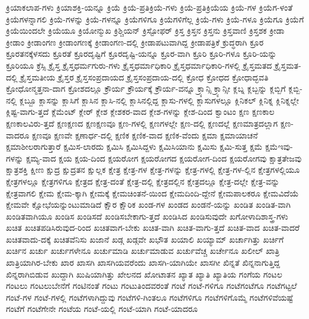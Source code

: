 {ಕ್ರಿಯಾಕಲಾಪ-ಗಳು
ಕ್ರಿಯಾಶಕ್ತಿ-ಯನ್ನೂ
ಕ್ರಿಯೆ
ಕ್ರಿಯೆ-ಪ್ರತಿಕ್ರಿಯೆ-ಗಳು
ಕ್ರಿಯೆ-ಪ್ರತಿಕ್ರಿಯೆಯ
ಕ್ರಿಯೆ-ಗಳ
ಕ್ರಿಯೆಗ-ಳಂತೆ
ಕ್ರಿಯೆಗಳನ್ನಾಗಲಿ
ಕ್ರಿಯೆ-ಗಳನ್ನು
ಕ್ರಿಯೆ-ಗಳನ್ನೂ
ಕ್ರಿಯೆಗಳಿಗೂ
ಕ್ರಿಯೆಗಳಿಗೆಲ್ಲ
ಕ್ರಿಯೆ-ಗಳು
ಕ್ರಿಯೆ-ಗಳೂ
ಕ್ರಿಯೆಗೂ
ಕ್ರಿಯೆಗೆ
ಕ್ರಿಯೆಯಿಂದಲೇ
ಕ್ರಿಯೆಯೂ
ಕ್ರಿಯೋನ್ಮುಖ
ಕ್ರಿಶ್ಚಿಯನ್
ಕ್ರಿಸ್ಟೋಫರ್
ಕ್ರಿಸ್ತ
ಕ್ರಿಸ್ತನ
ಕ್ರಿಸ್ತನು
ಕ್ರಿಸ್ತವಾಣಿ
ಕ್ರಿಸ್ತಶಕ
ಕ್ರೀಡಾ
ಕ್ರೀಡಾಂ
ಕ್ರೀಡಾಂಗಣ
ಕ್ರೀಡಾಂಗಣಕ್ಕೆ
ಕ್ರೀಡಾಂಗಣ-ದಲ್ಲಿ
ಕ್ರೀಡಾಪಟುವಾಗಿದ್ದ
ಕ್ರೀಡಾಪತ್ರಿಕೆ
ಕ್ರುದ್ಧರಾಗಿ
ಕ್ರೂರ
ಕ್ರೂರತನಕ್ಕೆಳಸದು
ಕ್ರೂರತೆ
ಕ್ರೂರದೃಷ್ಟಿಗೆ
ಕ್ರೂರದೃಷ್ಟಿ-ಯನ್ನೂ
ಕ್ರೂರ-ವಾಗಿ
ಕ್ರೂರಿ
ಕ್ರೂರಿ-ಗಳೂ
ಕ್ರೂರಿ-ಯನ್ನು
ಕ್ರೂರಿಯೂ
ಕ್ರೆಸ್ಸಿ
ಕ್ರೈಸ್ತ
ಕ್ರೈಸ್ತಧರ್ಮಗುರು-ಗಳು
ಕ್ರೈಸ್ತಧರ್ಮಾಧಿಕಾರಿ
ಕ್ರೈಸ್ತಧರ್ಮಾಧಿಕಾರಿ-ಗಳಲ್ಲಿ
ಕ್ರೈಸ್ತಮತದ
ಕ್ರೈಸ್ತಮತ-ದಲ್ಲಿ
ಕ್ರೈಸ್ತಮತೀಯ
ಕ್ರೈಸ್ತರ
ಕ್ರೈಸ್ತಸಂಪ್ರದಾಯದ
ಕ್ರೈಸ್ತಸಂಪ್ರದಾಯ-ದಲ್ಲಿ
ಕ್ರೋಧ
ಕ್ರೋಧದ
ಕ್ರೋಧಾದ್ಭವತಿ
ಕ್ರೋಧೋನ್ಮತ್ತನಾ-ದಾಗ
ಕ್ರೋಶದಲ್ಲೂ
ಕ್ರೌರ್ಯ
ಕ್ರೌರ್ಯಕ್ಕೆ
ಕ್ರೌರ್ಯ-ವನ್ನೂ
ಕ್ರ್ಯಾನ್ಸಿ
ಕ್ರ್ಯಾನ್ಸೀ
ಕ್ಲಬ್ನ
ಕ್ಲಬ್ಬನ್ನು
ಕ್ಲಬ್ಬಿಗೆ
ಕ್ಲಬ್ಬಿ-ನಲ್ಲಿ
ಕ್ಲಬ್ಬೂ
ಕ್ಲಾಸನ್ನು
ಕ್ಲಾಸಿಗೆ
ಕ್ಲಾಸಿನ
ಕ್ಲಾಸಿ-ನಲ್ಲಿ
ಕ್ಲಾಸಿನಲ್ಲಿದ್ದ
ಕ್ಲಾಸು-ಗಳಲ್ಲಿ
ಕ್ಲಾಸುಗಳಲ್ಲೂ
ಕ್ಲಿನಿಕಲ್
ಕ್ಲಿನಿಕ್ನ
ಕ್ಲಿನಿಕ್ನಲ್ಲೇ
ಕ್ಲಿಷ್ಟ-ವಾಗು-ತ್ತದೆ
ಕ್ಲೆಮೆಂಟ್
ಕ್ಲೇರ್
ಕ್ಲೇಶ
ಕ್ಲೇಶಕರ-ವಾದ
ಕ್ಲೇಶ-ಗಳನ್ನು
ಕ್ಲೇಶ-ದಿಂದ
ಕ್ವಾಂಟಂ
ಕ್ಷಣ
ಕ್ಷಣಕಾಲ
ಕ್ಷಣಕಾಲವಿರು-ತ್ತದೆ
ಕ್ಷಣಕ್ಷಣದ
ಕ್ಷಣಕ್ಷಣವೂ
ಕ್ಷಣ-ಗಳಲ್ಲಿ
ಕ್ಷಣಗಳಲ್ಲೇ
ಕ್ಷಣ-ದಲ್ಲಿ
ಕ್ಷಣದಲ್ಲೆ
ಕ್ಷಣಮಾತ್ರದಲ್ಲಾಗ
ಕ್ಷಣ-ವಾದರೂ
ಕ್ಷಣವೂ
ಕ್ಷಣವೇ
ಕ್ಷಣಾರ್ಧ-ದಲ್ಲಿ
ಕ್ಷಣಿಕ
ಕ್ಷಣಿಕ-ವಾದ
ಕ್ಷಣಿಕ-ವೆಂದು
ಕ್ಷಮಾ
ಕ್ಷಮಾಯಾಚನೆ
ಕ್ಷಮಾಶೀಲರಾಗುತ್ತಾರೆ
ಕ್ಷಮಿಸ-ಲಾರದು
ಕ್ಷಮಿಸಿ
ಕ್ಷಮಿಸಿದ್ದಳು
ಕ್ಷಮಿಸಿಯಾನು
ಕ್ಷಮಿಸು
ಕ್ಷಮಿ-ಸುತ್ತ
ಕ್ಷಮೆ
ಕ್ಷಮೆಇವು-ಗಳನ್ನು
ಕ್ಷಮ್ಯ-ವಾದ
ಕ್ಷಯ
ಕ್ಷಯ-ದಿಂದ
ಕ್ಷಯರೋಗ
ಕ್ಷಯರೋಗದ
ಕ್ಷಯರೋಗ-ದಿಂದ
ಕ್ಷಯರೋಗವು
ಕ್ಷಾತ್ರತೇಜವು
ಕ್ಷಾತ್ರಶಕ್ತಿ
ಕ್ಷೀಣ
ಕ್ಷುದ್ರ
ಕ್ಷುದ್ರತನ
ಕ್ಷುಲ್ಲಕ
ಕ್ಷೇತ್ರ
ಕ್ಷೇತ್ರ-ಗಳ
ಕ್ಷೇತ್ರ-ಗಳನ್ನು
ಕ್ಷೇತ್ರ-ಗಳಲ್ಲಿ
ಕ್ಷೇತ್ರ-ಗಳ-ಲ್ಲಿನ
ಕ್ಷೇತ್ರಗಳಲ್ಲಿಯೂ
ಕ್ಷೇತ್ರಗಳಲ್ಲೂ
ಕ್ಷೇತ್ರಗಳಿಗೂ
ಕ್ಷೇತ್ರದ
ಕ್ಷೇತ್ರ-ದಂತೆ
ಕ್ಷೇತ್ರ-ದಲ್ಲಿ
ಕ್ಷೇತ್ರದಲ್ಲಿನ
ಕ್ಷೇತ್ರದಲ್ಲೂ
ಕ್ಷೇತ್ರ-ದಲ್ಲೇ
ಕ್ಷೇತ್ರ-ವನ್ನು
ಕ್ಷೇತ್ರವಾಗಲಿ
ಕ್ಷೇಮ
ಕ್ಷೇಮ-ಕ್ಕಾಗಿ
ಕ್ಷೇಮಕ್ಕೆ
ಕ್ಷೇಮಚಿಂತನೆ-ಯಿಂದ
ಕ್ಷೇಮದಿಂದಿ-ದ್ದೇನೆ
ಕ್ಷೇಮಪಾಲಕರೂ
ಕ್ಷೇಮವಿದೆಯೆ
ಕ್ಷೇಮವೇ
ಕ್ಷೋಭೆಯನ್ನುಂಟುಮಾಡಿದೆ
ಕ್ಷೌರ
ಕ್ಷೌರಿಕ
ಖಂಡ-ಗಳ
ಖಂಡದ
ಖಂಡನೆ-ಯನ್ನು
ಖಂಡಿತ
ಖಂಡಿತ-ವಾಗಿ
ಖಂಡಿತವಾಗಿಯೂ
ಖಂಡಿಸ
ಖಂಡಿಸದೆ
ಖಂಡಿಸಬೇಕಾಗು-ತ್ತದೆ
ಖಂಡಿಸಿದ
ಖಂಡಿಸುವುದೇ
ಖಗೋಳಾದಿಶಾಸ್ತ್ರ-ಗಳು
ಖಚಿತ
ಖಚಿತಪಡಿಸಿರುವುದ-ರಿಂದ
ಖಚಿತವಾಗ-ಬೇಕು
ಖಚಿತ-ವಾಗಿ
ಖಚಿತ-ವಾಗು-ತ್ತದೆ
ಖಚಿತ-ವಾದ
ಖಚಿತ-ವಾದರೆ
ಖಚಿತವಾದು-ದಕ್ಕೆ
ಖಚಿತವೆನಿಸು
ಖಜಾನೆ
ಖಡ್ಗ
ಖಡ್ಗವೇ
ಖಭೌತ
ಖಯಾಲಿ
ಖಯ್ಯಾಮ್
ಖರ್ಚಾಗಿತ್ತು
ಖರ್ಚಿಗೆ
ಖರ್ಚಿನ
ಖರ್ಚು
ಖರ್ಚುಗಳೇನೂ
ಖರ್ಚುಮಾಡಿ
ಖರ್ಚುಮಾಡುವ
ಖರ್ಚುವೆಚ್ಚ
ಖರ್ಚೇನೂ
ಖಲೀಲ್
ಖಾತ್ರಿ
ಖಾತ್ರಿಯಾಗಿರ-ಬೇಕು
ಖಾರ
ಖಾಸಗಿ
ಖಾಸಗಿಯವರೆಂದು
ಖಾಸಗಿ-ಯಾಗಿಯೇ
ಖಾಸಗೀ
ಖಿನ್ನತೆ
ಖಿನ್ನನಾಗುತ್ತಿದ್ದ
ಖಿನ್ನರಾಗಿಬಿಡುವ
ಖುದ್ದಾಗಿ
ಖುಷಿಯಾಗಿತ್ತು
ಖೇಲನದ
ಖೋಟಾತನ
ಖ್ಯಾತ
ಖ್ಯಾತಿ
ಖ್ಯಾತಿಯ
ಗಂಗೆಯ
ಗಂಟಲ
ಗಂಟಲು
ಗಂಟಲುಬೇನೆಗೆ
ಗಂಟಿನಂತೆ
ಗಂಟು
ಗಂಟುತಿಂದವರಂತೆ
ಗಂಟೆ
ಗಂಟೆ-ಗಳಿಗೂ
ಗಂಟೆಗಂಟೆಗೂ
ಗಂಟೆಗಟ್ಟಲೆ
ಗಂಟೆ-ಗಳ
ಗಂಟೆ-ಗಳಲ್ಲಿ
ಗಂಟೆಗಳಾಗಿದ್ದುವು
ಗಂಟೆಗಳಿ-ಗಿಂತಲೂ
ಗಂಟೆಗಳಿಗೂ
ಗಂಟೆಗಳಿಗೊಮ್ಮೆ
ಗಂಟೆಗಳಿವೆಯಷ್ಟೆ
ಗಂಟೆಗೆ
ಗಂಟೆಗೇನೇ
ಗಂಟೆಯ
ಗಂಟೆ-ಯಲ್ಲಿ
ಗಂಟೆ-ಯಾಗಿ
ಗಂಟೆ-ಯಾದರೂ
}
